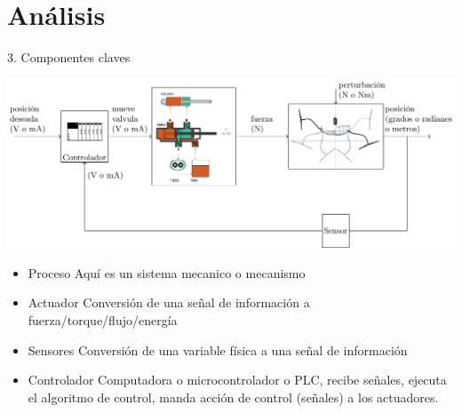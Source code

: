 \documentclass[presentation,aspectratio=169]{beamer}
\begin{document}
\section{Análisis}
\label{sec:org48915d9}

\begin{frame}[label={sec:orgd06e813}]{3. Componentes claves}
\begin{center}
\includegraphics[width=.8\textwidth]{../../figures/ac75-control-block-feedback-units}
\end{center}

\begin{itemize}
\item \alert{Proceso} Aquí es un \alert{sistema mecanico} o \alert{mecanismo}
\item \alert{Actuador} Conversión de una señal de información a fuerza/torque/flujo/energía
\item \alert{Sensores}  Conversión de una variable física a una señal de información
\item \alert{Controlador} Computadora o microcontrolador o PLC, recibe señales, ejecuta el algoritmo de control, manda acción de control (señales) a los actuadores.
\end{itemize}
\end{frame}
\end{document}
